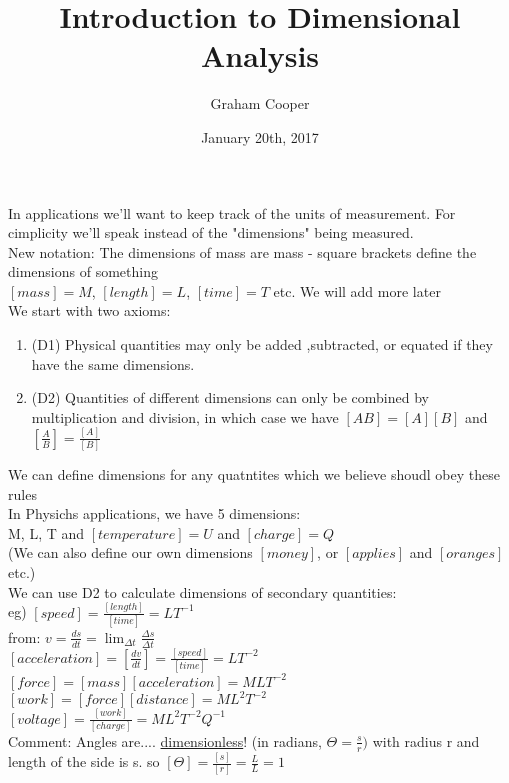 \documentclass[12pt]{article}
\title{\vspace{-15ex}Introduction to Dimensional Analysis\vspace{-1ex}}
\date{January 20th, 2017}
\author{Graham Cooper}
\begin{document}
	\maketitle
	
	In applications we'll want to keep track of the units of measurement. For cimplicity we'll speak instead of the "dimensions" being measured.\\
	New notation: The dimensions of mass are mass - square brackets define the dimensions of something\\
	$[mass] = M$, $[length] = L$, $[time] = T$ etc. We will add more later\\
	
	We start with two axioms:\\
	\begin{enumerate}
		\item (D1) Physical quantities may only be added ,subtracted, or equated if they have the same dimensions.
		\item (D2) Quantities of different dimensions can only be combined by multiplication and division, in which case we have $[AB] = [A][B]$ and $[\frac{A}{B}] = \frac{[A]}{[B]}$
	\end{enumerate}

	We can define dimensions for any quatntites which we believe shoudl obey these rules\\
	In Physichs applications, we have 5 dimensions:\\
	M, L, T and $[temperature] = U$ and $[charge] = Q$\\
	(We can also define our own dimensions $[money]$, or $[applies]$ and $[oranges]$ etc.)\\
	
	We can use D2 to calculate dimensions of secondary quantities:\\
	eg) $[speed] = \frac{[length]}{[time]} = LT^{-1}$\\
	from: $v = \frac{ds}{dt} = \lim_{\Delta t}\frac{\Delta s}{\Delta t}$\\
	
	$[acceleration] = [\frac{dv}{dt}] = \frac{[speed]}{[time]} = LT^{-2}$\\
	$[force] = [mass][acceleration] = MLT^{-2}$\\
	$[work] = [force][distance] = ML^2T^{-2}$\\
	$[voltage] = \frac{[work]}{[charge]} = ML^2T^{-2}Q^{-1}$\\
	
	Comment: Angles are.... \underline{dimensionless}! (in radians, $\Theta = \frac{s}{r})$ with radius r and length of the side is s. so $[\Theta] = \frac{[s]}{[r]} = \frac{L}{L} = 1$\\
\end{document}

